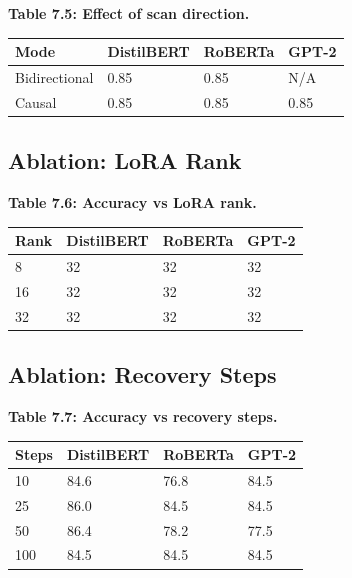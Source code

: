 \textbf{Table 7.5: Effect of scan direction.}

\begin{table}[H]
\centering
\small
\begin{tabular}{llll}
\toprule
\textbf{Mode} & \textbf{DistilBERT} & \textbf{RoBERTa} & \textbf{GPT-2} \\
\midrule
Bidirectional & 0.85 & 0.85 & N/A \\
Causal & 0.85 & 0.85 & 0.85 \\
\bottomrule
\end{tabular}
\end{table}

\subsection{Ablation: LoRA Rank}

\textbf{Table 7.6: Accuracy vs LoRA rank.}

\begin{table}[H]
\centering
\small
\begin{tabular}{llll}
\toprule
\textbf{Rank} & \textbf{DistilBERT} & \textbf{RoBERTa} & \textbf{GPT-2} \\
\midrule
8 & 32 & 32 & 32 \\
16 & 32 & 32 & 32 \\
32 & 32 & 32 & 32 \\
\bottomrule
\end{tabular}
\end{table}

\subsection{Ablation: Recovery Steps}

\textbf{Table 7.7: Accuracy vs recovery steps.}

\begin{table}[H]
\centering
\small
\begin{tabular}{llll}
\toprule
\textbf{Steps} & \textbf{DistilBERT} & \textbf{RoBERTa} & \textbf{GPT-2} \\
\midrule
10 & 84.6 & 76.8 & 84.5 \\
25 & 86.0 & 84.5 & 84.5 \\
50 & 86.4 & 78.2 & 77.5 \\
100 & 84.5 & 84.5 & 84.5 \\
\bottomrule
\end{tabular}
\end{table}

